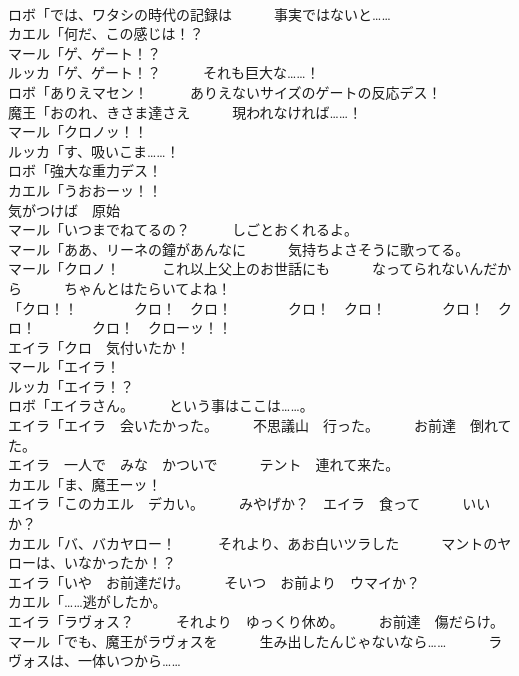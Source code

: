 \documentclass[8pt]{extreport}
\begin{document}
\begin{CJK}{UTF8}{min}
\\	ロボ「では、ワタシの時代の記録は　　　事実ではないと……	
\\	カエル「何だ、この感じは！？	
\\	マール「ゲ、ゲート！？	
\\	ルッカ「ゲ、ゲート！？　　　それも巨大な……！	
\\	ロボ「ありえマセン！　　　ありえないサイズのゲートの反応デス！	
\\	魔王「おのれ、きさま達さえ　　　現われなければ……！	
\\	マール「クロノッ！！	
\\	ルッカ「す、吸いこま……！	
\\	ロボ「強大な重力デス！	
\\	カエル「うおおーッ！！	
\\	気がつけば　原始	
\\	マール「いつまでねてるの？　　　しごとおくれるよ。	
\\	マール「ああ、リーネの鐘があんなに　　　気持ちよさそうに歌ってる。	
\\	マール「クロノ！　　　これ以上父上のお世話にも　　　なってられないんだから　　　ちゃんとはたらいてよね！	
\\	「クロ！！　　　　クロ！　クロ！　　　　クロ！　クロ！　　　　クロ！　クロ！　　　　クロ！　クローッ！！	
\\	エイラ「クロ　気付いたか！	
\\	マール「エイラ！	
\\	ルッカ「エイラ！？	
\\	ロボ「エイラさん。　　　という事はここは……。	
\\	エイラ「エイラ　会いたかった。　　　不思議山　行った。　　　お前達　倒れてた。	
\\	エイラ　一人で　みな　かついで　　　テント　連れて来た。	
\\	カエル「ま、魔王ーッ！	
\\	エイラ「このカエル　デカい。　　　みやげか？　エイラ　食って　　　いいか？	
\\	カエル「バ、バカヤロー！　　　それより、あお白いツラした　　　マントのヤローは、いなかったか！？	
\\	エイラ「いや　お前達だけ。　　　そいつ　お前より　ウマイか？	
\\	カエル「……逃がしたか。	
\\	エイラ「ラヴォス？　　　それより　ゆっくり休め。　　　お前達　傷だらけ。	
\\	マール「でも、魔王がラヴォスを　　　生み出したんじゃないなら……　　　ラヴォスは、一体いつから……	

\end{CJK}
\end{document}
